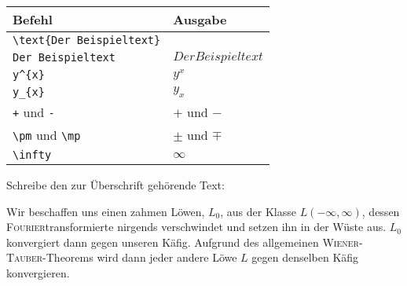 \documentclass["WS\space 16-17\space -\space LaTeX-Kurs\space -\space Praesentation\space -\space 1.tex"]{subfiles}
\begin{document}
\begin{frame}[fragile]
	\begin{center}
		\begin{tabular}{ll}
			\toprule
			Befehl									&	Ausgabe					\\ \midrule
			\lstinline|\text{Der Beispieltext}|		&	\text{Der Beispieltext}	\\
			\lstinline|Der Beispieltext|			&	$Der Beispieltext$		\\
			\lstinline|y^{x}|						&	$y^{x}$					\\
			\lstinline|y_{x}|						&	$y_{x}$					\\
			\lstinline|+|	und 	\lstinline|-|	&	$+$	und $-$				\\
			\lstinline|\pm| und \lstinline|\mp|		&	$\pm$ und $\mp$			\\
			\lstinline|\infty|						&	$\infty$			    \\
			\bottomrule
		\end{tabular}
	\end{center}
	\pause\btVFill
	\Aufgabee
		Schreibe den zur Überschrift  gehörende Text:
	\begin{outputbox}
		Wir beschaffen uns einen zahmen Löwen, $L_0$, aus der Klasse $L(- \infty, \infty)$, dessen \textsc{Fourier}transformierte nirgends verschwindet und setzen ihn in der Wüste aus. $L_0$ konvergiert dann gegen unseren Käfig. Aufgrund des allgemeinen \textsc{Wiener}-\textsc{Tauber}-Theorems wird dann jeder andere Löwe $L$ gegen denselben Käfig konvergieren.
	\end{outputbox}
	\vspace{0.3cm}
\end{frame}
\end{document}
